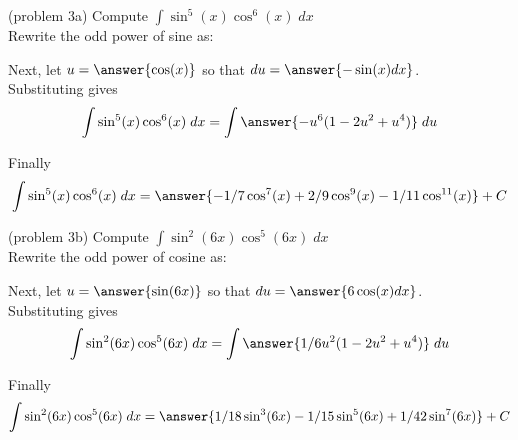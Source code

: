 \documentclass{ximera}
\begin{document}
\begin{problem}(problem 3a) 
Compute $\displaystyle{\int \sin^5(x)\cos^6(x) \; dx}$\\

Rewrite the odd power of sine as:

\begin{multipleChoice}
\end{multipleChoice}

Next, let $u = \answer{\cos(x)}$ so that $du = \answer{-\sin(x) dx}$.\\

Substituting gives
\[
\int \sin^5(x)\cos^6(x) \; dx= \int \answer{-u^6(1-2u^2 + u^4)} \; du
\]

Finally
\[
\int \sin^5(x)\cos^6(x) \; dx= \answer{-1/7 \cos^7(x) + 2/9 \cos^9(x) - 1/11 \cos^{11}(x)} + C
\]

\end{problem}



\begin{problem}{\color{gray}(problem 3b)} 
Compute $\displaystyle{\int \sin^2(6x)\cos^5(6x) \; dx}$\\

Rewrite the odd power of cosine as:

\begin{multipleChoice}
\end{multipleChoice}

Next, let $u = \answer{\sin(6x)}$ so that $du = \answer{6 \cos(x) dx}$.\\

Substituting gives
\[
\int \sin^2(6x)\cos^5(6x) \; dx= \int \answer{1/6 u^2(1-2u^2 + u^4)} \; du
\]

Finally
\[
\int \sin^2(6x)\cos^5(6x) \; dx= \answer{1/18 \sin^3(6x) - 1/15 \sin^5(6x) + 1/42 \sin^7(6x)} + C
\]
\end{problem}
\end{document}
